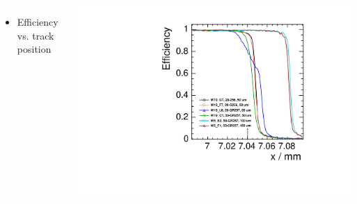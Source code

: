 \begin{frame}
\begin{columns}
\begin{columns}
      \centering
    \end{columns}

  \end{columns}

  \begin{columns}[t]
    
    \begin{itemize}
    \item Efficiency vs. track position
    \end{itemize}
    \centering
    \includegraphics[width=\textwidth, page=9]{../figures/TestBeam/edge_bcp.pdf}
    

\end{columns}
\end{frame}
